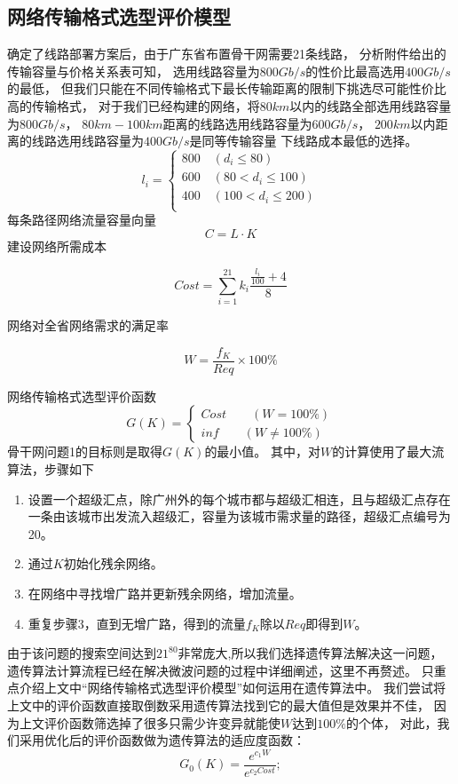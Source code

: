 \documentclass[UTF8,12pt]{ctexart}
\begin{document}
\subsection{网络传输格式选型评价模型}\label{WLCSGS}
确定了线路部署方案后，由于广东省布置骨干网需要21条线路，
分析附件给出的传输容量与价格关系表可知，
选用线路容量为$800Gb/s$的性价比最高选用$400Gb/s$的最低，
但我们只能在不同传输格式下最长传输距离的限制下挑选尽可能性价比高的传输格式，
对于我们已经构建的网络，将$80km$以内的线路全部选用线路容量为$800Gb/s$，
$80km-100km$距离的线路选用线路容量为$600Gb/s$，
$200km$以内距离的线路选用线路容量为$400Gb/s$是同等传输容量
下线路成本最低的选择。$$l_i=\begin{cases}
        800\quad (d_i\leqslant 80)       \\
        600\quad  (80<d_i\leqslant 100)  \\
        400\quad  (100<d_i\leqslant 200) \\
    \end{cases} $$
每条路径网络流量容量向量$$C=L·K$$
建设网络所需成本
\begin{large}
    $$Cost=\sum_{i=1}^{21}k_i\frac{\frac{l_i}{100}+4}{8}$$
\end{large}
网络对全省网络需求的满足率
\begin{large}
    $$W=\frac{f_K}{Req}×100\%$$
\end{large}
网络传输格式选型评价函数$$G(K)=\begin{cases}
        Cost \quad \quad (W=100\%) \\
        inf  \quad \quad (W\not=100\%)
    \end{cases}
$$
骨干网问题1的目标则是取得$G(K)$的最小值。
其中，对$W$的计算使用了最大流算法，步骤如下
\begin{enumerate}
    \item 设置一个超级汇点，除广州外的每个城市都与超级汇相连，且与超级汇点存在一条由该城市出发流入超级汇，容量为该城市需求量的路径，超级汇点编号为20。
    \item 通过$K$初始化残余网络。
    \item 在网络中寻找增广路并更新残余网络，增加流量。
    \item 重复步骤3，直到无增广路，得到的流量$f_K$除以$Req$即得到$W$。
\end{enumerate}

由于该问题的搜索空间达到$21^{80}$非常庞大,所以我们选择遗传算法解决这一问题，
遗传算法计算流程已经在解决微波问题的过程中详细阐述，这里不再赘述。
只重点介绍上文中“网络传输格式选型评价模型”如何运用在遗传算法中。
我们尝试将上文中的评价函数直接取倒数采用遗传算法找到它的最大值但是效果并不佳，
因为上文评价函数筛选掉了很多只需少许变异就能使$W$达到$100\%$的个体，
对此，我们采用优化后的评价函数做为遗传算法的适应度函数：
$$G_0(K)=\frac{e^{c_1W}}{e^{c_2Cost}};$$
\end{document}
